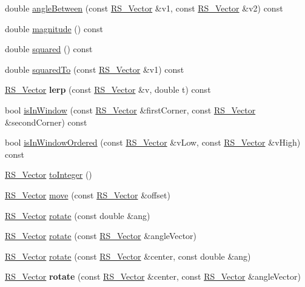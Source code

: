 \begin{DoxyCompactItemize}
double \hyperlink{classRS__Vector_a1a84623b84ee49f66eecf2a34517a9a4}{angle\-Between} (const \hyperlink{classRS__Vector}{R\-S\-\_\-\-Vector} \&v1, const \hyperlink{classRS__Vector}{R\-S\-\_\-\-Vector} \&v2) const 
\item 
double \hyperlink{classRS__Vector_a641f6f702e187ff7473fbe48af9a01aa}{magnitude} () const 
\item 
double \hyperlink{classRS__Vector_a64eabc097972d0b0718638c1b711f053}{squared} () const 
\item 
double \hyperlink{classRS__Vector_a758f4d5c9f3740b5bb70370ab72cd821}{squared\-To} (const \hyperlink{classRS__Vector}{R\-S\-\_\-\-Vector} \&v1) const 
\item 
\hypertarget{classRS__Vector_af16d3508d470f965c0cc5f48e306e7c1}{\hyperlink{classRS__Vector}{R\-S\-\_\-\-Vector} {\bfseries lerp} (const \hyperlink{classRS__Vector}{R\-S\-\_\-\-Vector} \&v, double t) const }\label{classRS__Vector_af16d3508d470f965c0cc5f48e306e7c1}

\item 
bool \hyperlink{classRS__Vector_a80003521417a9e7a3b2d73300d95d093}{is\-In\-Window} (const \hyperlink{classRS__Vector}{R\-S\-\_\-\-Vector} \&first\-Corner, const \hyperlink{classRS__Vector}{R\-S\-\_\-\-Vector} \&second\-Corner) const 
\item 
bool \hyperlink{classRS__Vector_acdaa542c1c5868d04c1ab6e132c320ae}{is\-In\-Window\-Ordered} (const \hyperlink{classRS__Vector}{R\-S\-\_\-\-Vector} \&v\-Low, const \hyperlink{classRS__Vector}{R\-S\-\_\-\-Vector} \&v\-High) const 
\item 
\hyperlink{classRS__Vector}{R\-S\-\_\-\-Vector} \hyperlink{classRS__Vector_af06490486efa030356177ac3a22d59bb}{to\-Integer} ()
\item 
\hyperlink{classRS__Vector}{R\-S\-\_\-\-Vector} \hyperlink{classRS__Vector_af269abe625aaca1edbe5af17cb8f3311}{move} (const \hyperlink{classRS__Vector}{R\-S\-\_\-\-Vector} \&offset)
\item 
\hyperlink{classRS__Vector}{R\-S\-\_\-\-Vector} \hyperlink{classRS__Vector_a4061d72b6163af997e79235a419541af}{rotate} (const double \&ang)
\item 
\hyperlink{classRS__Vector}{R\-S\-\_\-\-Vector} \hyperlink{classRS__Vector_a86846fd28e9354ead7162c13918e8853}{rotate} (const \hyperlink{classRS__Vector}{R\-S\-\_\-\-Vector} \&angle\-Vector)
\item 
\hyperlink{classRS__Vector}{R\-S\-\_\-\-Vector} \hyperlink{classRS__Vector_a2e958ac115b9f804c0d55dcb11058814}{rotate} (const \hyperlink{classRS__Vector}{R\-S\-\_\-\-Vector} \&center, const double \&ang)
\item 
\hypertarget{classRS__Vector_a880f086e7c1d5dfd6c37e15ad3798ee2}{\hyperlink{classRS__Vector}{R\-S\-\_\-\-Vector} {\bfseries rotate} (const \hyperlink{classRS__Vector}{R\-S\-\_\-\-Vector} \&center, const \hyperlink{classRS__Vector}{R\-S\-\_\-\-Vector} \&angle\-Vector)}\label{classRS__Vector_a880f086e7c1d5dfd6c37e15ad3798ee2}


\end{DoxyCompactItemize}
